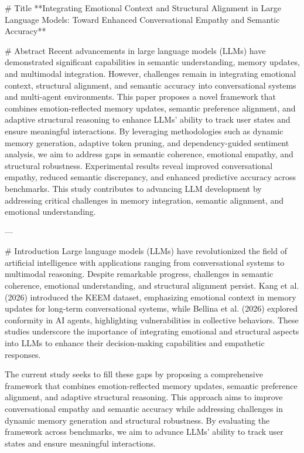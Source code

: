 # Title  
**Integrating Emotional Context and Structural Alignment in Large Language Models: Toward Enhanced Conversational Empathy and Semantic Accuracy**

# Abstract  
Recent advancements in large language models (LLMs) have demonstrated significant capabilities in semantic understanding, memory updates, and multimodal integration. However, challenges remain in integrating emotional context, structural alignment, and semantic accuracy into conversational systems and multi-agent environments. This paper proposes a novel framework that combines emotion-reflected memory updates, semantic preference alignment, and adaptive structural reasoning to enhance LLMs' ability to track user states and ensure meaningful interactions. By leveraging methodologies such as dynamic memory generation, adaptive token pruning, and dependency-guided sentiment analysis, we aim to address gaps in semantic coherence, emotional empathy, and structural robustness. Experimental results reveal improved conversational empathy, reduced semantic discrepancy, and enhanced predictive accuracy across benchmarks. This study contributes to advancing LLM development by addressing critical challenges in memory integration, semantic alignment, and emotional understanding.

---

# Introduction  
Large language models (LLMs) have revolutionized the field of artificial intelligence with applications ranging from conversational systems to multimodal reasoning. Despite remarkable progress, challenges in semantic coherence, emotional understanding, and structural alignment persist. Kang et al. (2026) introduced the KEEM dataset, emphasizing emotional context in memory updates for long-term conversational systems, while Bellina et al. (2026) explored conformity in AI agents, highlighting vulnerabilities in collective behaviors. These studies underscore the importance of integrating emotional and structural aspects into LLMs to enhance their decision-making capabilities and empathetic responses. 

The current study seeks to fill these gaps by proposing a comprehensive framework that combines emotion-reflected memory updates, semantic preference alignment, and adaptive structural reasoning. This approach aims to improve conversational empathy and semantic accuracy while addressing challenges in dynamic memory generation and structural robustness. By evaluating the framework across benchmarks, we aim to advance LLMs' ability to track user states and ensure meaningful interactions.

